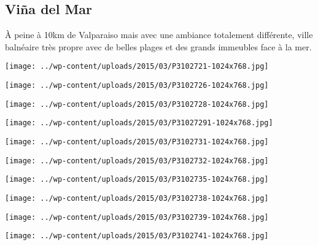  \subsection*{Viña del Mar}
 \`A peine à 10km de Valparaiso mais avec une ambiance totalement différente, ville balnéaire très propre avec de belles plages et des grands immeubles face à la mer.
\begin{center} \texttt{[image: ../wp-content/uploads/2015/03/P3102721-1024x768.jpg]} \end{center}
\begin{center} \texttt{[image: ../wp-content/uploads/2015/03/P3102726-1024x768.jpg]} \end{center}
\begin{center} \texttt{[image: ../wp-content/uploads/2015/03/P3102728-1024x768.jpg]} \end{center}
\begin{center} \texttt{[image: ../wp-content/uploads/2015/03/P31027291-1024x768.jpg]} \end{center}
\begin{center} \texttt{[image: ../wp-content/uploads/2015/03/P3102731-1024x768.jpg]} \end{center}
\begin{center} \texttt{[image: ../wp-content/uploads/2015/03/P3102732-1024x768.jpg]} \end{center}
\begin{center} \texttt{[image: ../wp-content/uploads/2015/03/P3102735-1024x768.jpg]} \end{center}
\begin{center} \texttt{[image: ../wp-content/uploads/2015/03/P3102738-1024x768.jpg]} \end{center}
\begin{center} \texttt{[image: ../wp-content/uploads/2015/03/P3102739-1024x768.jpg]} \end{center}
\begin{center} \texttt{[image: ../wp-content/uploads/2015/03/P3102741-1024x768.jpg]} \end{center}